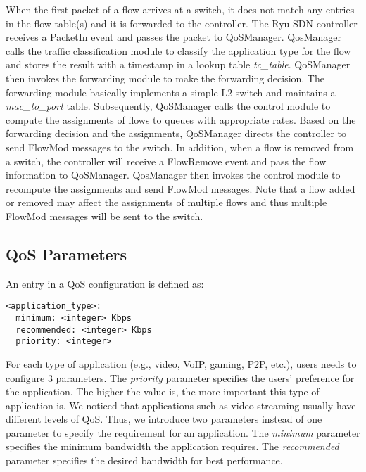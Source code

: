 When the first packet of a flow arrives at a switch, it does not match any entries in the flow table(s) and
it is forwarded to the controller. The Ryu SDN controller receives a \textsf{PacketIn} event and passes the
packet to QoSManager. QosManager calls the traffic classification module to classify the application type for
the flow and stores the result with a timestamp in a lookup table \emph{tc\_table}. QoSManager then invokes
the forwarding module to make the forwarding decision. The forwarding module basically implements a simple L2
switch and maintains a \emph{mac\_to\_port} table. Subsequently, QoSManager calls the control module to compute
the assignments of flows to queues with appropriate rates. Based on the forwarding decision and the assignments,
QoSManager directs the controller to send \textsf{FlowMod} messages to the switch. In addition, when a flow is
removed from a switch, the controller will receive a \textsf{FlowRemove} event and pass the flow information to
QoSManager. QosManager then invokes the control module to recompute the assignments and send \textsf{FlowMod}
messages. Note that a flow added or removed may affect the assignments of multiple flows and thus multiple
\textsf{FlowMod} messages will be sent to the switch. 

\subsection{QoS Parameters}
\label{sect:qos params}
An entry in a QoS configuration is defined as:

\begin{lstlisting}[basicstyle=\sffamily]
<application_type>:
  minimum: <integer> Kbps
  recommended: <integer> Kbps
  priority: <integer>
\end{lstlisting}

For each type of application (e.g., video, VoIP, gaming, P2P, etc.), users needs to configure 3 parameters. The \emph{priority}
parameter specifies the users' preference for the application. The higher the value is, the more important this type of
application is. We noticed that applications such as video streaming usually have different levels of QoS. Thus, we introduce two
parameters instead of one parameter to specify the requirement for an application. The \emph{minimum} parameter specifies
the minimum bandwidth the application requires. The \emph{recommended} parameter specifies the desired bandwidth for best
performance. 

